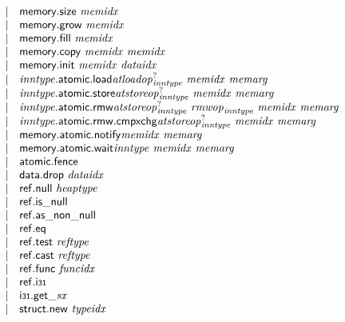 $$\begin{array}[t]{@{}lrrl@{}l@{}}
& & | & \mathsf{memory{.}size}~{\mathit{memidx}} \\
& & | & \mathsf{memory{.}grow}~{\mathit{memidx}} \\
& & | & \mathsf{memory{.}fill}~{\mathit{memidx}} \\
& & | & \mathsf{memory{.}copy}~{\mathit{memidx}}~{\mathit{memidx}} \\
& & | & \mathsf{memory{.}init}~{\mathit{memidx}}~{\mathit{dataidx}} \\
& & | & {{\mathit{inntype}}{.}\mathsf{atomic}{.}\mathsf{load}}{{{{\mathit{atloadop}}}_{{\mathit{inntype}}}^?}}~{\mathit{memidx}}~{\mathit{memarg}} \\
& & | & {{\mathit{inntype}}{.}\mathsf{atomic}{.}\mathsf{store}}{{{{\mathit{atstoreop}}}_{{\mathit{inntype}}}^?}}~{\mathit{memidx}}~{\mathit{memarg}} \\
& & | & {{\mathit{inntype}}{.}\mathsf{atomic}{.}\mathsf{rmw}}{{{{\mathit{atstoreop}}}_{{\mathit{inntype}}}^?}}~{{\mathit{rmwop}}}_{{\mathit{inntype}}}~{\mathit{memidx}}~{\mathit{memarg}} \\
& & | & {{\mathit{inntype}}{.}\mathsf{atomic}{.}\mathsf{rmw}{.}\mathsf{cmpxchg}}{{{{\mathit{atstoreop}}}_{{\mathit{inntype}}}^?}}~{\mathit{memidx}}~{\mathit{memarg}} \\
& & | & {\mathsf{memory{.}atomic{.}notify}}{{\mathit{memidx}}}~{\mathit{memarg}} \\
& & | & {\mathsf{memory{.}atomic{.}wait}}{{\mathit{inntype}}}~{\mathit{memidx}}~{\mathit{memarg}} \\
& & | & \mathsf{atomic{.}fence} \\
& & | & \mathsf{data{.}drop}~{\mathit{dataidx}} \\
& & | & \mathsf{ref{.}null}~{\mathit{heaptype}} \\
& & | & \mathsf{ref{.}is\_null} \\
& & | & \mathsf{ref{.}as\_non\_null} \\
& & | & \mathsf{ref{.}eq} \\
& & | & \mathsf{ref{.}test}~{\mathit{reftype}} \\
& & | & \mathsf{ref{.}cast}~{\mathit{reftype}} \\
& & | & \mathsf{ref{.}func}~{\mathit{funcidx}} \\
& & | & \mathsf{ref{.}i{\scriptstyle 31}} \\
& & | & {\mathsf{i{\scriptstyle 31}{.}get}}{\mathsf{\_}}{{\mathit{sx}}} \\
& & | & \mathsf{struct{.}new}~{\mathit{typeidx}} \\

\end{array}$$
